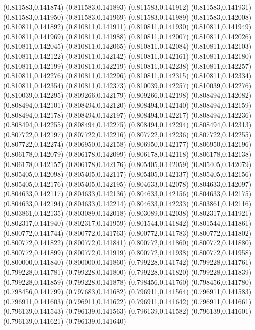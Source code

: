 (0.811583,0.141874)
(0.811583,0.141893)
(0.811583,0.141912)
(0.811583,0.141931)
(0.811583,0.141950)
(0.811583,0.141969)
(0.811583,0.141989)
(0.811583,0.142008)
(0.810811,0.141892)
(0.810811,0.141911)
(0.810811,0.141930)
(0.810811,0.141949)
(0.810811,0.141969)
(0.810811,0.141988)
(0.810811,0.142007)
(0.810811,0.142026)
(0.810811,0.142045)
(0.810811,0.142065)
(0.810811,0.142084)
(0.810811,0.142103)
(0.810811,0.142122)
(0.810811,0.142142)
(0.810811,0.142161)
(0.810811,0.142180)
(0.810811,0.142199)
(0.810811,0.142219)
(0.810811,0.142238)
(0.810811,0.142257)
(0.810811,0.142276)
(0.810811,0.142296)
(0.810811,0.142315)
(0.810811,0.142334)
(0.810811,0.142354)
(0.810811,0.142373)
(0.810039,0.142257)
(0.810039,0.142276)
(0.810039,0.142295)
(0.809266,0.142179)
(0.809266,0.142198)
(0.808494,0.142082)
(0.808494,0.142101)
(0.808494,0.142120)
(0.808494,0.142140)
(0.808494,0.142159)
(0.808494,0.142178)
(0.808494,0.142197)
(0.808494,0.142217)
(0.808494,0.142236)
(0.808494,0.142255)
(0.808494,0.142275)
(0.808494,0.142294)
(0.808494,0.142313)
(0.807722,0.142197)
(0.807722,0.142216)
(0.807722,0.142236)
(0.807722,0.142255)
(0.807722,0.142274)
(0.806950,0.142158)
(0.806950,0.142177)
(0.806950,0.142196)
(0.806178,0.142079)
(0.806178,0.142099)
(0.806178,0.142118)
(0.806178,0.142138)
(0.806178,0.142157)
(0.806178,0.142176)
(0.805405,0.142059)
(0.805405,0.142079)
(0.805405,0.142098)
(0.805405,0.142117)
(0.805405,0.142137)
(0.805405,0.142156)
(0.805405,0.142176)
(0.805405,0.142195)
(0.804633,0.142078)
(0.804633,0.142097)
(0.804633,0.142117)
(0.804633,0.142136)
(0.804633,0.142156)
(0.804633,0.142175)
(0.804633,0.142194)
(0.804633,0.142214)
(0.804633,0.142233)
(0.803861,0.142116)
(0.803861,0.142135)
(0.803089,0.142018)
(0.803089,0.142038)
(0.802317,0.141921)
(0.802317,0.141940)
(0.802317,0.141959)
(0.801544,0.141842)
(0.801544,0.141861)
(0.800772,0.141744)
(0.800772,0.141763)
(0.800772,0.141783)
(0.800772,0.141802)
(0.800772,0.141822)
(0.800772,0.141841)
(0.800772,0.141860)
(0.800772,0.141880)
(0.800772,0.141899)
(0.800772,0.141919)
(0.800772,0.141938)
(0.800772,0.141958)
(0.800000,0.141840)
(0.800000,0.141860)
(0.799228,0.141742)
(0.799228,0.141761)
(0.799228,0.141781)
(0.799228,0.141800)
(0.799228,0.141820)
(0.799228,0.141839)
(0.799228,0.141859)
(0.799228,0.141878)
(0.798456,0.141760)
(0.798456,0.141780)
(0.798456,0.141799)
(0.797683,0.141682)
(0.796911,0.141564)
(0.796911,0.141583)
(0.796911,0.141603)
(0.796911,0.141622)
(0.796911,0.141642)
(0.796911,0.141661)
(0.796139,0.141543)
(0.796139,0.141563)
(0.796139,0.141582)
(0.796139,0.141601)
(0.796139,0.141621)
(0.796139,0.141640)
